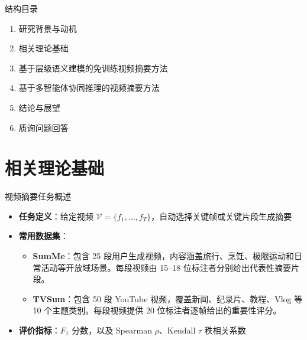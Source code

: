 \begin{frame}{结构目录}
  \begin{enumerate}
    \item 研究背景与动机
    \item 相关理论基础
    \item 基于层级语义建模的免训练视频摘要方法
    \item 基于多智能体协同推理的视频摘要方法
    \item 结论与展望
    \item 质询问题回答
  \end{enumerate}
\end{frame}

\section{相关理论基础}

\begin{frame}{视频摘要任务概述}
  \begin{itemize}
    \item \textbf{任务定义}：给定视频 $\mathcal{V}=\{f_1,\ldots,f_T\}$，自动选择关键帧或关键片段生成摘要
    \item \textbf{常用数据集}：
      \begin{itemize}
        \item \textbf{SumMe}：包含 25 段用户生成视频，内容涵盖旅行、烹饪、极限运动和日常活动等开放域场景。每段视频由 15--18 位标注者分别给出代表性摘要片段。
        \item \textbf{TVSum}：包含 50 段 YouTube 视频，覆盖新闻、纪录片、教程、Vlog 等 10 个主题类别。每段视频提供 20 位标注者逐帧给出的重要性评分。
      \end{itemize}
    \item \textbf{评价指标}：$F_1$ 分数，以及 Spearman $\rho$、Kendall $\tau$ 秩相关系数
  \end{itemize}
\end{frame}

